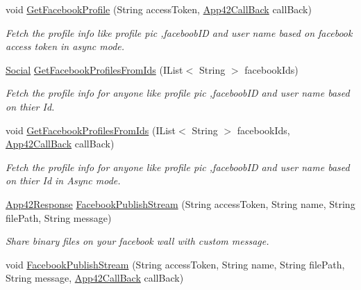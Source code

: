 \begin{DoxyCompactItemize}
void \hyperlink{classcom_1_1shephertz_1_1app42_1_1paas_1_1sdk_1_1csharp_1_1social_1_1_social_service_a38ad158121be84c48bb356468dfd3aa2}{Get\+Facebook\+Profile} (String access\+Token, \hyperlink{interfacecom_1_1shephertz_1_1app42_1_1paas_1_1sdk_1_1csharp_1_1_app42_call_back}{App42\+Call\+Back} call\+Back)
\begin{DoxyCompactList}\small\item\em Fetch the profile info like profile pic ,faceboob\+I\+D and user name based on facebook access token in async mode. \end{DoxyCompactList}\item 
\hyperlink{classcom_1_1shephertz_1_1app42_1_1paas_1_1sdk_1_1csharp_1_1social_1_1_social}{Social} \hyperlink{classcom_1_1shephertz_1_1app42_1_1paas_1_1sdk_1_1csharp_1_1social_1_1_social_service_a4db07d30b7eb4980c9b1646de0594d82}{Get\+Facebook\+Profiles\+From\+Ids} (I\+List$<$ String $>$ facebook\+Ids)
\begin{DoxyCompactList}\small\item\em Fetch the profile info for anyone like profile pic ,faceboob\+I\+D and user name based on thier Id. \end{DoxyCompactList}\item 
void \hyperlink{classcom_1_1shephertz_1_1app42_1_1paas_1_1sdk_1_1csharp_1_1social_1_1_social_service_a496450e80594e404547947de9c6f3b0b}{Get\+Facebook\+Profiles\+From\+Ids} (I\+List$<$ String $>$ facebook\+Ids, \hyperlink{interfacecom_1_1shephertz_1_1app42_1_1paas_1_1sdk_1_1csharp_1_1_app42_call_back}{App42\+Call\+Back} call\+Back)
\begin{DoxyCompactList}\small\item\em Fetch the profile info for anyone like profile pic ,faceboob\+I\+D and user name based on thier Id in Async mode. \end{DoxyCompactList}\item 
\hyperlink{classcom_1_1shephertz_1_1app42_1_1paas_1_1sdk_1_1csharp_1_1_app42_response}{App42\+Response} \hyperlink{classcom_1_1shephertz_1_1app42_1_1paas_1_1sdk_1_1csharp_1_1social_1_1_social_service_a7dec3231f8e274bcd3f1738f27faea0f}{Facebook\+Publish\+Stream} (String access\+Token, String name, String file\+Path, String message)
\begin{DoxyCompactList}\small\item\em Share binary files on your facebook wall with custom message. \end{DoxyCompactList}\item 
void \hyperlink{classcom_1_1shephertz_1_1app42_1_1paas_1_1sdk_1_1csharp_1_1social_1_1_social_service_a551879fe0e380b97a0a9f4bdfd6a5ffc}{Facebook\+Publish\+Stream} (String access\+Token, String name, String file\+Path, String message, \hyperlink{interfacecom_1_1shephertz_1_1app42_1_1paas_1_1sdk_1_1csharp_1_1_app42_call_back}{App42\+Call\+Back} call\+Back)

\end{DoxyCompactItemize}
